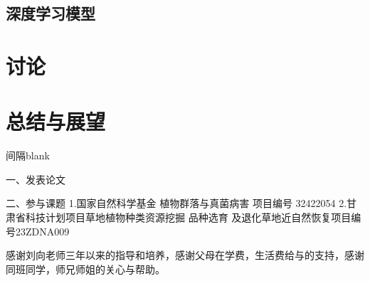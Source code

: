 \documentclass[AutoFakeBold]{LZUThesis-PgD&PhD}
\begin{document}
%		
	
	
	
	
	\section{深度学习模型}
	
	
	
	
	
	\chapter{讨论}
	
	\chapter{总结与展望}
	
	\blank
	
	间隔blank
	\blankpage
	
	
	
	
	\backmatter
	
	
	\printbib
	
	
	
	\Achievements
	一、发表论文
	
	
	\blank
	
	二、参与课题
	1.国家自然科学基金 植物群落与真菌病害 项目编号 32422054
	2.甘肃省科技计划项目草地植物种类资源挖掘 品种选育 及退化草地近自然恢复项目编号23ZDNA009
	
	
	\Thanks
	
	感谢刘向老师三年以来的指导和培养，感谢父母在学费，生活费给与的支持，感谢同班同学，师兄师姐的关心与帮助。
	
	
	
\end{document}
